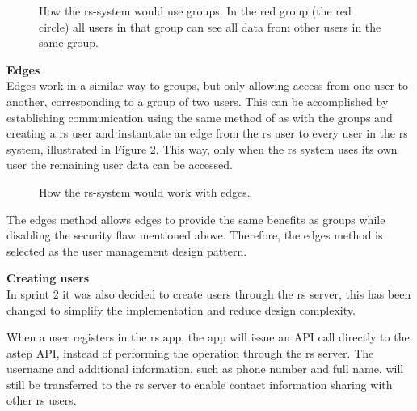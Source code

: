 \begin{figure}[h]
	\centering
	\label{fig:astepgroup}
	\caption{How the \gls{rs}-system would use groups. In the red group (the red circle) all users in that group can see all data from other users in the same group.}
\end{figure}

\textbf{Edges}\\ 
Edges work in a similar way to groups, but only allowing access from one user to another, corresponding to a group of two users.
This can be accomplished by establishing communication using the same method of as with the groups and creating a \gls{rs} user and instantiate an edge from the \gls{rs} user to every user in the \gls{rs} system, illustrated in Figure \ref{fig:astepedge}.
This way, only when the \gls{rs} system uses its own user the remaining user data can be accessed.

\begin{figure}[h]
	\centering
	\caption{How the \gls{rs}-system would work with edges.}
	\label{fig:astepedge}
\end{figure}

The edges method allows edges to provide the same benefits as groups while disabling the security flaw mentioned above.
Therefore, the edges method is selected as the user management design pattern.

\textbf{Creating users}\\
In sprint 2 it was also decided to create users through the \gls{rs} server, this has been changed to simplify the implementation and reduce design complexity.

When a user registers in the \gls{rs} app, the app will issue an API call directly to the \gls{astep} API, instead of performing the operation through the \gls{rs} server. 
The username and additional information, such as phone number and full name, will still be transferred to the \gls{rs} server to enable contact information sharing with other \gls{rs} users.